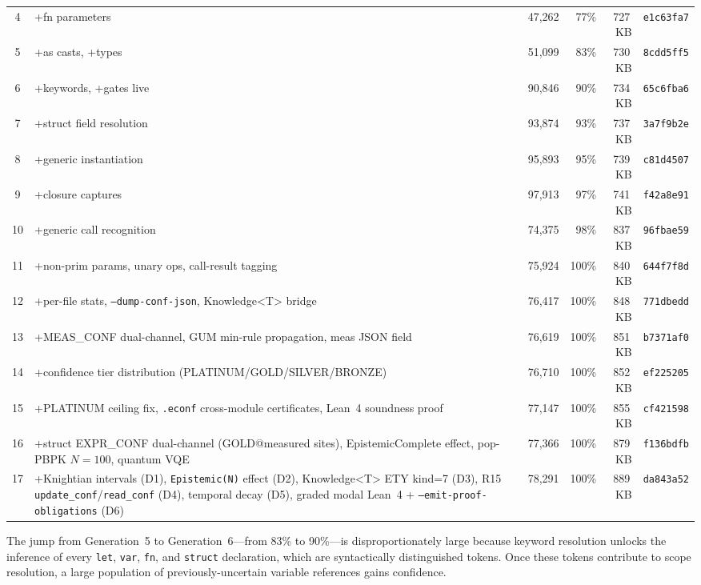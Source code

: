 \documentclass[acmsmall,screen,review,anonymous]{acmart}
\begin{document}
\begin{table}[t]
\begin{tabular}{@{}clrrrl@{}}
4 & +fn parameters            &  47,262 & 77\% & 727\,KB & \texttt{e1c63fa7} \\
5 & +as casts, +types         &  51,099 & 83\% & 730\,KB & \texttt{8cdd5ff5} \\
6 & +keywords, +gates live    &  90,846 & 90\% & 734\,KB & \texttt{65c6fba6} \\
7 & +struct field resolution  &  93,874 & 93\% & 737\,KB & \texttt{3a7f9b2e} \\
8 & +generic instantiation    &  95,893 & 95\% & 739\,KB & \texttt{c81d4507} \\
9 & +closure captures         &  97,913 & 97\% & 741\,KB & \texttt{f42a8e91} \\
10 & +generic call recognition &  74,375 & 98\% & 837\,KB & \texttt{96fbae59} \\
11 & +non-prim params, unary ops, call-result tagging &  75,924 & 100\% & 840\,KB & \texttt{644f7f8d} \\
12 & +per-file stats, \texttt{--dump-conf-json}, Knowledge\textless T\textgreater{} bridge & 76,417 & 100\% & 848\,KB & \texttt{771dbedd} \\
13 & +MEAS\_CONF dual-channel, GUM min-rule propagation, meas JSON field & 76,619 & 100\% & 851\,KB & \texttt{b7371af0} \\
14 & +confidence tier distribution (PLATINUM/GOLD/SILVER/BRONZE) & 76,710 & 100\% & 852\,KB & \texttt{ef225205} \\
15 & +PLATINUM ceiling fix, \texttt{.econf} cross-module certificates, Lean~4 soundness proof & 77,147 & 100\% & 855\,KB & \texttt{cf421598} \\
16 & +struct EXPR\_CONF dual-channel (GOLD@measured sites), EpistemicComplete effect, pop-PBPK $N{=}100$, quantum VQE & 77,366 & 100\% & 879\,KB & \texttt{f136bdfb} \\
17 & +Knightian intervals (D1), \texttt{Epistemic(N)} effect (D2), Knowledge\textless T\textgreater{} ETY kind=7 (D3), R15 \texttt{update\_conf}/\texttt{read\_conf} (D4), temporal decay (D5), graded modal Lean~4 + \texttt{--emit-proof-obligations} (D6) & 78,291 & 100\% & 889\,KB & \texttt{da843a52} \\
\bottomrule
\end{tabular}
\end{table}

The jump from Generation~5 to Generation~6---from 83\% to 90\%---is
disproportionately large because keyword resolution unlocks the
inference of every \texttt{let}, \texttt{var}, \texttt{fn}, and
\texttt{struct} declaration, which are syntactically distinguished
tokens.
Once these tokens contribute to scope resolution, a large population
of previously-uncertain variable references gains confidence.
\end{document}
